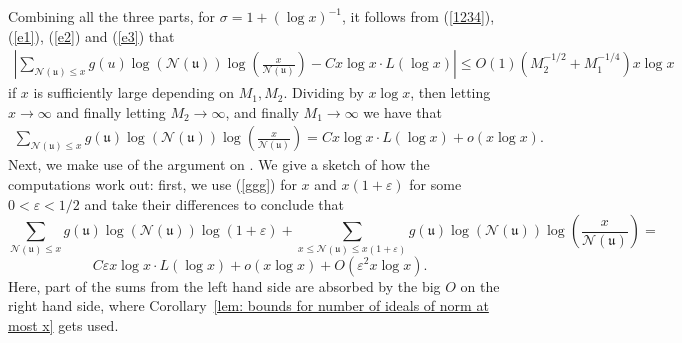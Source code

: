\documentclass[11pt]{amsart}
\theoremstyle{definition}
\newcommand{\NN}{{\mathcal N}}
\newcommand{\mf}{\mathfrak}
\newcommand{\FM}[1]{{\color{violet}{{#1}}}}
\newcommand{\WS}[1]{{\color{blue}{{#1}}}}
\begin{document}


Combining all the three parts, for $\sigma=1+(\log x)^{-1}$, it follows from (\ref{1234}), (\ref{e1}), (\ref{e2}) and (\ref{e3}) that
     \begin{equation}\nonumber
    \begin{split}
       \left| \sum_{ \NN(\mf u)\leq x}g(u)\log(\NN(\mf u))\log\left(\frac{x}{\NN(\mf u)}\right)-Cx\log x\cdot L(\log x)\right|\leq O(1)(M_{2}^{-1/2}+M_{1}^{-1/4})x\log x
    \end{split}
 \end{equation}
 if $x$ is sufficiently large depending on $M_{1},M_{2}$.
 Dividing by $x\log x$, then letting $x\to\infty$ and finally letting $M_{2}\to\infty$, and finally $M_{1} \to \infty$ we have that 
  \begin{equation}\label{ggg}
    \begin{split}
      \sum_{\NN(\mf u)\leq x}g(\mf u)\log(\NN(\mf u))\log\left(\frac{x}{\NN(\mf u)}\right)=Cx\log x \cdot L(\log x)+o(x\log x).
    \end{split}
 \end{equation}
 Next, we make use of the argument on \cite[p. 240]{E79book}. 
We give a sketch of how the computations work out:
first, we use (\ref{ggg}) for $x$ and $x(1+\varepsilon)$ for some $0<\varepsilon<1/2$ and take their differences to conclude that
\[
\sum_{\NN(\mf u) \leq x} g(\mf u)\log(\NN(\mf u))\log(1+\varepsilon)+\sum_{x \leq \NN(\mf u) \leq x(1+\varepsilon)} g(\mf u) \log(\NN(\mf u)) \log\left(\frac{x}{\NN(\mf u)}\right) = \]
\[
C\varepsilon x\log x \cdot L(\log x)+o(x\log x)+O(\varepsilon^2x\log x).
\]
Here, part of the sums from the left hand side are absorbed by the big $O$ on the right hand side, where Corollary~\ref{lem: bounds for number of ideals of norm at most x} gets used.
\end{document}
